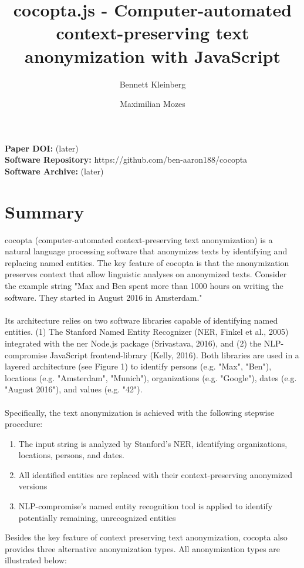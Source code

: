\documentclass{article}
\title{\vspace{-2.0cm}cocopta.js - Computer-automated context-preserving text anonymization with JavaScript
}
\author[1,$\dagger$]{Bennett Kleinberg}
\author[2,$\dagger$]{Maximilian Mozes}
\affil[1]{University of Amsterdam, The Netherlands}
\affil[2]{Technical University of Munich, Germany}
\affil[$\dagger$]{Both authors contributed equally to the development of this tool and are listed in alphabetical order.}
\begin{document}
\maketitle

\noindent \textbf{Paper DOI:} (later) \\
\textbf{Software Repository:} https://github.com/ben-aaron188/cocopta \\
\textbf{Software Archive:} (later)

\section*{Summary}
cocopta (computer-automated context-preserving text anonymization) is a natural language processing software that anonymizes texts by identifying and replacing named entities. The key feature of cocopta is that the anonymization preserves context that allow linguistic analyses on anonymized texts. Consider the example string "Max and Ben spent more than 1000 hours on writing the software. They started in August 2016 in Amsterdam." \\\\
\noindent Its architecture relies on two software libraries capable of identifying named entities. (1) The Stanford Named Entity Recognizer (NER, Finkel et al., 2005) integrated with the ner Node.js package (Srivastava, 2016), and (2) the NLP-compromise JavaScript frontend-library (Kelly, 2016). Both libraries are used in a layered architecture (see Figure 1) to identify persons (e.g. "Max", "Ben"), locations (e.g. "Amsterdam", "Munich"), organizations (e.g. "Google"), dates (e.g. "August 2016"), and values (e.g. "42"). \\\\
\noindent Specifically, the text anonymization is achieved with the following stepwise procedure:
\begin{enumerate} \itemsep -2pt
\item The input string is analyzed by Stanford's NER, identifying organizations, locations, persons, and dates.
\item All identified entities are replaced with their context-preserving anonymized versions
\item NLP-compromise's named entity recognition tool is applied to identify potentially remaining, unrecognized entities
\end{enumerate}
Besides the key feature of context preserving text anonymization, cocopta also provides three alternative anonymization types. All anonymization types are illustrated below:
\end{document}
